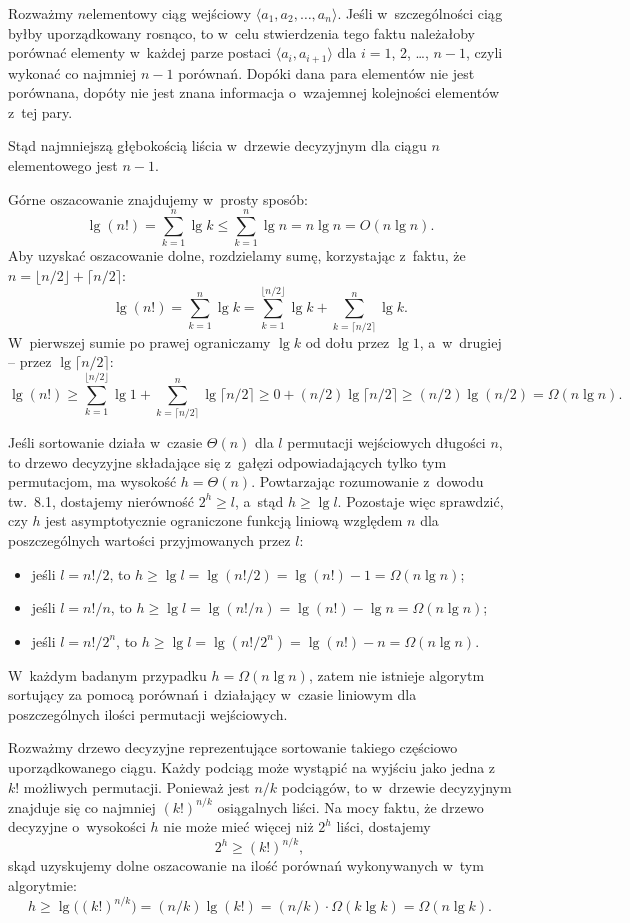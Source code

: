 
\exercise %
Rozważmy $n$\nbhyphen elementowy ciąg wejściowy $\langle a_1,a_2,\dots,a_n\rangle$.
Jeśli w~szczególności ciąg byłby uporządkowany rosnąco, to w~celu stwierdzenia tego faktu należałoby porównać elementy w~każdej parze postaci $\langle a_i,a_{i+1}\rangle$ dla $i=1$, 2, \dots, $n-1$, czyli wykonać co najmniej $n-1$ porównań.
Dopóki dana para elementów nie jest porównana, dopóty nie jest znana informacja o~wzajemnej kolejności elementów z~tej pary.

Stąd najmniejszą głębokością liścia w~drzewie decyzyjnym dla ciągu $n$\nbhyphen elementowego jest $n-1$.

\exercise %
Górne oszacowanie znajdujemy w~prosty sposób:
\[
	\lg(n!) = \sum_{k=1}^n\lg k \le \sum_{k=1}^n\lg n = n\lg n = O(n\lg n).
\]
Aby uzyskać oszacowanie dolne, rozdzielamy sumę, korzystając z~faktu, że $n=\lfloor n/2\rfloor+\lceil n/2\rceil$:
\[
	\lg(n!) = \sum_{k=1}^n\lg k = \sum_{k=1}^{\lfloor n/2\rfloor}\lg k+\sum_{k=\lceil n/2\rceil}^n\lg k.
\]
W~pierwszej sumie po prawej ograniczamy $\lg k$ od dołu przez $\lg1$, a~w~drugiej -- przez $\lg\lceil n/2\rceil$:
\[
	\lg(n!) \ge \sum_{k=1}^{\lfloor n/2\rfloor}\lg1+\sum_{k=\lceil n/2\rceil}^n\lg\lceil n/2\rceil \ge 0+(n/2)\lg\lceil n/2\rceil \ge (n/2)\lg(n/2) = \Omega(n\lg n).
\]

\exercise %
Jeśli sortowanie działa w~czasie $\Theta(n)$ dla $l$ permutacji wejściowych długości $n$, to drzewo decyzyjne składające się z~gałęzi odpowiadających tylko tym permutacjom, ma wysokość $h=\Theta(n)$.
Powtarzając rozumowanie z~dowodu tw.\ 8.1, dostajemy nierówność $2^h\ge l$, a~stąd $h\ge\lg l$.
Pozostaje więc sprawdzić, czy $h$ jest asymptotycznie ograniczone funkcją liniową względem $n$ dla poszczególnych wartości przyjmowanych przez $l$:
\begin{itemize}
	\item jeśli $l=n!/2$, to $h\ge\lg l=\lg(n!/2)=\lg(n!)-1=\Omega(n\lg n)$;
	\item jeśli $l=n!/n$, to $h\ge\lg l=\lg(n!/n)=\lg(n!)-\lg n=\Omega(n\lg n)$;
	\item jeśli $l=n!/2^n$, to $h\ge\lg l=\lg(n!/2^n)=\lg(n!)-n=\Omega(n\lg n)$.
\end{itemize}
W~każdym badanym przypadku $h=\Omega(n\lg n)$, zatem nie istnieje algorytm sortujący za pomocą porównań i~działający w~czasie liniowym dla poszczególnych ilości permutacji wejściowych.

\exercise %
Rozważmy drzewo decyzyjne reprezentujące sortowanie takiego częściowo uporządkowanego ciągu.
Każdy podciąg może wystąpić na wyjściu jako jedna z~$k!$ możliwych permutacji.
Ponieważ jest $n/k$ podciągów, to w~drzewie decyzyjnym znajduje się co najmniej $(k!)^{n/k}$ osiągalnych liści.
Na mocy faktu, że drzewo decyzyjne o~wysokości $h$ nie może mieć więcej niż $2^h$ liści, dostajemy
\[
	2^h \ge (k!)^{n/k},
\]
skąd uzyskujemy dolne oszacowanie na ilość porównań wykonywanych w~tym algorytmie:
\[
	h \ge \lg\bigl((k!)^{n/k}\bigr) = (n/k)\lg(k!) = (n/k)\cdot\Omega(k\lg k) = \Omega(n\lg k).
\]
